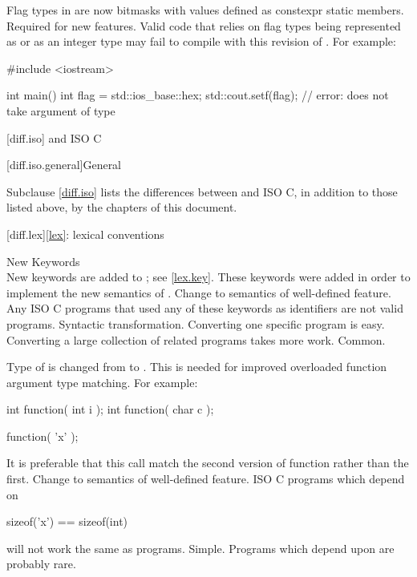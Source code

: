 \change
Flag types in  are now bitmasks with values
defined as constexpr static members.
\rationale
Required for new features.
\effect
Valid \CppIII{} code that relies on  flag types being
represented as  or as an integer type may fail to compile
with this revision of \Cpp{}. For example:
\begin{codeblock}
#include <iostream>

int main() {
  int flag = std::ios_base::hex;
  std::cout.setf(flag);         // error:  does not take argument of type 
}
\end{codeblock}

[diff.iso]{\Cpp{} and ISO C}

[diff.iso.general]{General}

\pnum
{}%
Subclause \ref{diff.iso} lists the differences between \Cpp{} and ISO C,
in addition to those listed above,
by the chapters of this document.

[diff.lex]{\ref{lex}: lexical conventions}

\change
New Keywords\\
New keywords are added to \Cpp{};
see \ref{lex.key}.
\rationale
These keywords were added in order to implement the new
semantics of \Cpp{}.
\effect
Change to semantics of well-defined feature.
Any ISO C programs that used any of these keywords as identifiers
are not valid \Cpp{} programs.
\difficulty
Syntactic transformation.
Converting one specific program is easy.
Converting a large collection
of related programs takes more work.
\howwide
Common.

\change
Type of  is changed from  to .
\rationale
This is needed for improved overloaded function argument type
matching.
For example:
\begin{codeblock}
int function( int i );
int function( char c );

function( 'x' );
\end{codeblock}

It is preferable that this call match the second version of
function rather than the first.
\effect
Change to semantics of well-defined feature.
ISO C programs which depend on
\begin{codeblock}
sizeof('x') == sizeof(int)
\end{codeblock}
will not work the same as \Cpp{} programs.
\difficulty
Simple.
\howwide
Programs which depend upon  are probably rare.

